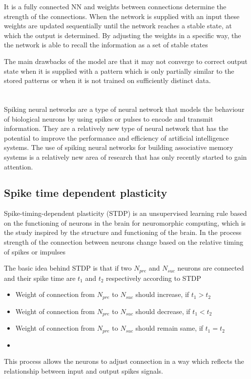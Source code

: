 It is a fully connected NN and weights between connections determine the
strength of the connections. When the network is supplied with an input these
weights are updated sequentially until the network reaches a stable state, at
which the output is determined. By adjusting the weights in a specific way, the
the network is able to recall the information as a set of stable states

The main drawbacks of the model are that it may not converge to correct output
state when it is supplied with a pattern which is only partially similar to the
stored patterns or when it is not trained on sufficiently distinct data.

\section{\Snn}
Spiking neural networks are a type of neural network that models the behaviour
of biological neurons by using spikes or pulses to encode and transmit
information. They are a relatively new type of neural network that has the
potential to improve the performance and efficiency of artificial intelligence
systems. The use of spiking neural networks for building associative memory
systems is a relatively new area of research that has only recently started to
gain attention.
\subsection{Spike time dependent plasticity}
Spike-timing-dependent plasticity (STDP)\cite{stdp} is an unsupervised learning
rule based on the functioning of neurons in the brain for neuromorphic
computing, which is the study inspired by the structure and functioning of the
brain. In the process strength of the connection between neurons change based
on the relative timing of spikes or impulses

The basic idea behind STDP is that if two $N_{pre}$ and $N_{suc}$ neurons are
connected and their spike time are $t_1$ and $t_2$ respectively according to
STDP \vspace*{-.3pc}
\begin{itemize}
    \item[]Weight of connection from $N_{pre}$ to $N_{suc}$ should  increase, if {\boldmath$t_1>t_2$}
    \item[]Weight of connection from $N_{pre}$ to $N_{suc}$ should  decrease, if {\boldmath$t_1<t_2$}
    \item[]Weight of connection from $N_{pre}$ to $N_{suc}$ should  remain same, if {\boldmath$t_1=t_2$}
    \item[]
\end{itemize}
\vspace*{-2.5pc}
This process allows the neurons to adjust connection in a way which reflects
the relationship between input and output spikes signals.
